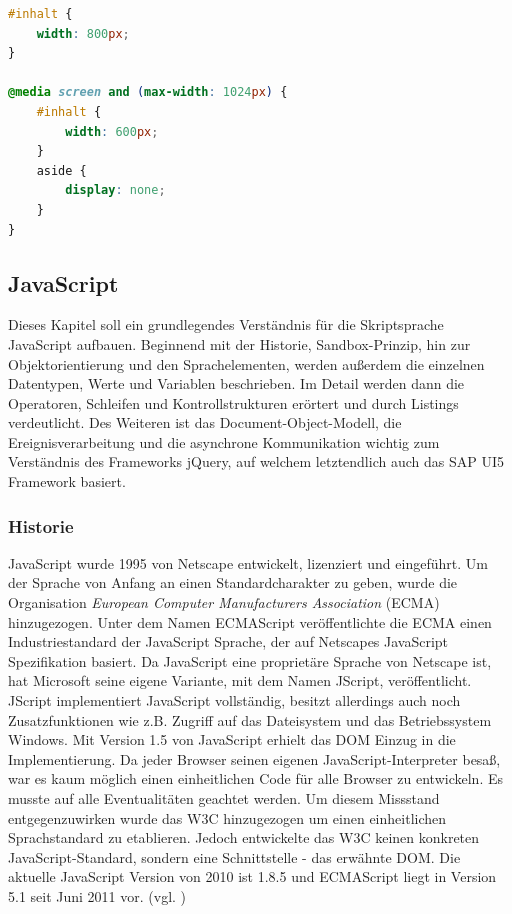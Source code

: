 \vspace{1em}
\begin{lstlisting}[language=CSS, caption=CSS3 eigenschaftsspezifisches Stylesheet, label=lst:css3mediaquery]
#inhalt {
	width: 800px;
}
 
@media screen and (max-width: 1024px) {
	#inhalt {
		width: 600px;
	}
	aside {
		display: none;
	}
}
\end{lstlisting}

\subsection{JavaScript}
Dieses Kapitel soll ein grundlegendes Verständnis für die Skriptsprache JavaScript aufbauen. Beginnend mit der Historie, Sandbox-Prinzip, hin zur Objektorientierung und den Sprachelementen, werden außerdem die einzelnen Datentypen, Werte und Variablen beschrieben. Im Detail werden dann die Operatoren, Schleifen und Kontrollstrukturen erörtert und durch Listings verdeutlicht. Des Weiteren ist das Document-Object-Modell, die Ereignisverarbeitung und die asynchrone Kommunikation wichtig zum Verständnis des Frameworks jQuery, auf welchem letztendlich auch das SAP UI5 Framework basiert.

\subsubsection{Historie} JavaScript wurde 1995 von Netscape entwickelt, lizenziert und eingeführt. Um der Sprache von Anfang an einen Standardcharakter zu geben, wurde die Organisation \textit{European Computer Manufacturers Association} (ECMA) hinzugezogen. Unter dem Namen ECMAScript veröffentlichte die ECMA einen Industriestandard der JavaScript Sprache, der auf Netscapes JavaScript Spezifikation basiert. Da JavaScript eine proprietäre Sprache von Netscape ist, hat Microsoft seine eigene Variante, mit dem Namen JScript, veröffentlicht. JScript implementiert JavaScript vollständig, besitzt allerdings auch noch Zusatzfunktionen wie z.B. Zugriff auf das Dateisystem und das Betriebssystem Windows. Mit Version 1.5 von JavaScript erhielt das DOM Einzug in die Implementierung. Da jeder Browser seinen eigenen JavaScript-Interpreter besaß, war es kaum möglich einen einheitlichen Code für alle Browser zu entwickeln. Es musste auf alle Eventualitäten geachtet werden. Um diesem Missstand entgegenzuwirken wurde das W3C hinzugezogen um einen einheitlichen Sprachstandard zu etablieren. Jedoch entwickelte das W3C keinen konkreten JavaScript-Standard, sondern eine Schnittstelle - das erwähnte DOM. Die aktuelle JavaScript Version von 2010 ist 1.8.5 und ECMAScript liegt in Version 5.1 seit Juni 2011 vor. (vgl. \cite{SelfHtml20146})

